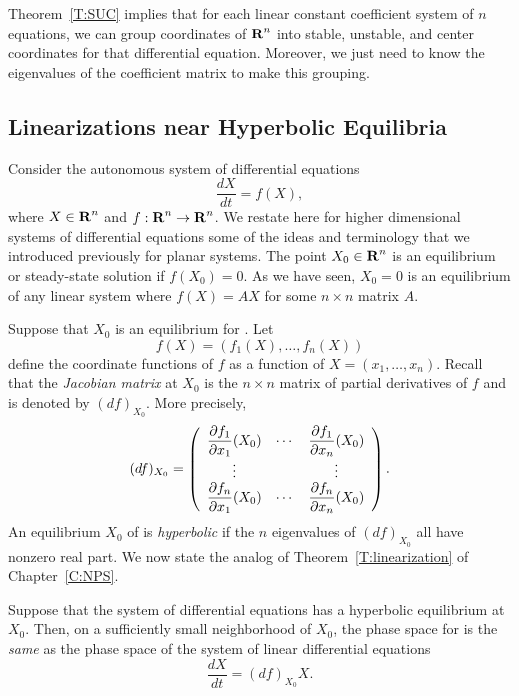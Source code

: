 Theorem~\ref{T:SUC} implies that for each linear constant coefficient system
of $n$ equations, we can group coordinates of $\mbox{$\bf{R}$}^n$ into stable, unstable,
and center coordinates for that differential equation.  Moreover, we just 
need to know the eigenvalues of the coefficient matrix to make this grouping.


\subsection*{Linearizations near Hyperbolic Equilibria}

Consider the autonomous system of differential equations 
\begin{equation} \label{e:eqnn}
\frac{dX}{dt} = f(X),
\end{equation}
where $X\in\mbox{$\bf{R}$}^n$ and $f:\mbox{$\bf{R}$}^n\to\mbox{$\bf{R}$}^n$.  We restate here for higher dimensional 
systems of 
differential equations some of the ideas and terminology that we introduced
previously for planar systems.  The point $X_0\in\mbox{$\bf{R}$}^n$ is an equilibrium 
 or steady-state solution 
if $f(X_0)=0$.  As we have seen, 
$X_0=0$ is an equilibrium of any linear system where $f(X)=AX$ for some 
$n\times n$ matrix $A$. 

Suppose that $X_0$ is an equilibrium for .  Let 
\[
f(X) = (f_1(X),\ldots,f_n(X))
\]
define the coordinate functions of $f$ as a function of $X=(x_1,\ldots,x_n)$.
Recall that the {\em Jacobian matrix\/}
at $X_0$ is the $n\times n$ matrix of partial 
derivatives of $f$ and is denoted by $(df)_{X_0}$.  
  More precisely, 
\arraystart
\[
(df)_{X_0} = \left(\begin{array}{ccc}
\displaystyle\frac{\partial f_1}{\partial x_1}(X_0) & \cdots & 
\displaystyle\frac{\partial f_1}{\partial x_n}(X_0) \\ \vdots &  & \vdots \\
\displaystyle\frac{\partial f_n}{\partial x_1}(X_0) & \cdots & 
\displaystyle\frac{\partial f_n}{\partial x_n}(X_0) \end{array}\right).
\]
\arrayfinish
An equilibrium $X_0$ of  is {\em hyperbolic\/} if the $n$
eigenvalues of $(df)_{X_0}$ all have nonzero real part. We now state 
the analog of Theorem~\ref{T:linearization} of Chapter~\ref{C:NPS}.

\begin{thm}  \label{T:nlinearization}
Suppose that the system of differential equations  has a 
hyperbolic equilibrium at $X_0$.  Then, on a sufficiently small neighborhood 
of $X_0$, the phase space for  is the {\em same\/} as the phase 
space of the system of linear differential equations
\begin{equation}  \label{e:nlinearizedeqn}
\frac{dX}{dt} = (df)_{X_0}X.
\end{equation}
\end{thm} 

